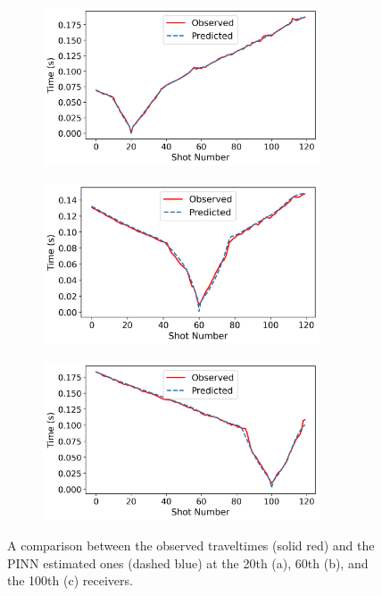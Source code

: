  \begin{figure}
       \centering
       \begin{subfigure}[]{.9\textwidth}
               \centering
               \includegraphics[width=0.9\textwidth]{figures/chap04_field_data/shot20.png} 
               \caption{}
               \label{fig:shot20}
       \end{subfigure}
       \begin{subfigure}[]{.9\textwidth}
               \centering
               \includegraphics[width=0.9\textwidth]{figures/chap04_field_data/shot60.png}
               \caption{}
               \label{fig:shot60}
       \end{subfigure}
       \begin{subfigure}[]{.9\textwidth}
               \centering
               \includegraphics[width=0.9\textwidth]{figures/chap04_field_data/shot100.png}
               \caption{}
               \label{fig:shot100}
       \end{subfigure}
       \caption{A comparison between the observed traveltimes (solid red) and the PINN estimated ones (dashed blue) at the 20th (a), 60th (b), and the 100th (c) receivers.}
       \label{fig:shots}
\end{figure}